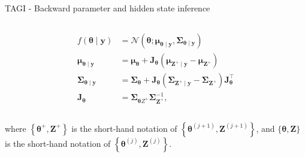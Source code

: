 \documentclass[final]{beamer}
\begin{document}
\begin{frame}[t]
\begin{columns}
\begin{column}[T]{.31\textwidth}
\begin{block}{TAGI - Backward parameter and hidden state inference}
\begin{columns}
\begin{column}{0.5\textwidth}
\begin{equation*}
\begin{split}
f(\boldsymbol{\theta} \mid \boldsymbol{y}) &=\mathcal{N}\left(\boldsymbol{\theta} ; \boldsymbol{\mu}_{\boldsymbol{\theta} \mid \boldsymbol{y}}, \boldsymbol{\Sigma}_{\boldsymbol{\theta} \mid \boldsymbol{y}}\right) \\
\boldsymbol{\mu}_{\boldsymbol{\theta} \mid \boldsymbol{y}} &=\boldsymbol{\mu}_{\boldsymbol{\theta}}+\mathbf{J}_{\boldsymbol{\theta}}\left(\boldsymbol{\mu}_{\boldsymbol{Z}^{+} \mid \boldsymbol{y}}-\boldsymbol{\mu}_{\boldsymbol{Z}^{+}}\right) \\
\boldsymbol{\Sigma}_{\boldsymbol{\theta} \mid \boldsymbol{y}} &=\boldsymbol{\Sigma}_{\boldsymbol{\theta}}+\mathbf{J}_{\boldsymbol{\theta}}\left(\boldsymbol{\Sigma}_{\boldsymbol{Z}^{+} \mid \boldsymbol{y}}-\boldsymbol{\Sigma}_{\boldsymbol{Z}^{+}}\right) \mathbf{J}_{\boldsymbol{\theta}}^{\top} \\
\mathbf{J}_{\boldsymbol{\theta}} &=\boldsymbol{\Sigma}_{\boldsymbol{\theta} Z^{+}} \boldsymbol{\Sigma}_{\boldsymbol{Z}^{+}}^{-1},
\end{split}
\end{equation*}
\end{column}
\end{columns}
where $\left\{\boldsymbol{\theta}^{+}, \boldsymbol{Z}^{+}\right\}$ is the short-hand notation of $\left\{\boldsymbol{\theta}^{(j+1)}, \boldsymbol{Z}^{(j+1)}\right\}$, and $\{\boldsymbol{\theta}, \boldsymbol{Z}\}$ is the short-hand notation of  $\left\{\boldsymbol{\theta}^{(j)}, \boldsymbol{Z}^{(j)}\right\}$.
\end{block}


\end{column}
\end{columns}
\end{frame}
\end{document}
